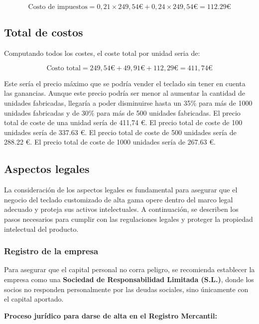 \begin{equation}
\text{Costo de impuestos} = 0,21 \times 249,54 \euro + 0,24 \times 249,54 \euro = 112.29 \euro
\end{equation}

\subsection{Total de costos}
Computando todos los costes, el coste total por unidad seria de:

\begin{equation}
\text{Costo total} = 249,54 \euro + 49,91 \euro + 112,29 \euro = 411,74 \euro
\end{equation}

Este sería el precio máximo que se podría vender el teclado sin tener en cuenta las ganancias. Aunque este precio podría ser menor al aumentar la cantidad de unidades fabricadas, llegaría a poder disminuirse hasta un 35\% para más de 1000 unidades fabricadas y de 30\% para más de 500 unidades fabricadas.
El precio total de coste de una unidad sería de 411,74 \euro.
El precio total de coste de 100 unidades sería de 337.63 \euro.
El precio total de coste de 500 unidades sería de 288.22 \euro.
El precio total de coste de 1000 unidades sería de 267.63 \euro.

\subsection{Aspectos legales}

La consideración de los aspectos legales es fundamental para asegurar que el negocio del teclado customizado de alta gama opere dentro del marco legal adecuado y proteja sus activos intelectuales. A continuación, se describen los pasos necesarios para cumplir con las regulaciones legales y proteger la propiedad intelectual del producto.

\subsubsection{Registro de la empresa}

Para asegurar que el capital personal no corra peligro, se recomienda establecer la empresa como una \textbf{Sociedad de Responsabilidad Limitada (S.L.)}, donde los socios no responden personalmente por las deudas sociales, sino únicamente con el capital aportado.

\textbf{Proceso jurídico para darse de alta en el Registro Mercantil:}

